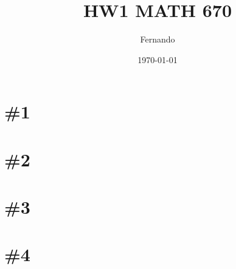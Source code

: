 \documentclass{article}
\begin{document}
\title{HW1 MATH 670}
\author{Fernando}
\date{\today}
\maketitle

\section{\#1}
\section{\#2}
\section{\#3}
\section{\#4}
\end{document}
